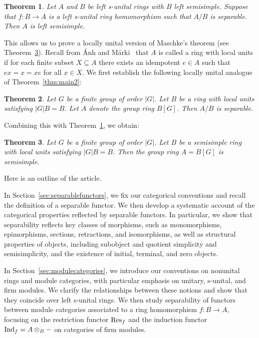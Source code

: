 \documentclass[12pt]{amsart}
\newtheorem{thm}{Theorem}
\theoremstyle{definition}
\newcommand{\Res}{{\rm Res}}
\newcommand{\Ind}{{\rm Ind}}
\begin{document}
\begin{thm}\label{thm:main4}
Let $A$ and $B$ be left s-unital rings
with $B$ left semisimple.
Suppose that $f : B \to A$ is a left s-unital 
ring homomorphism such that $A/B$ 
is separable.
Then $A$ is left semisimple.
\end{thm}

This allows us to prove a locally unital version of Maschke's
theorem (see Theorem~\ref{thm:main6}). 
Recall from \'{A}nh and 
M\'{a}rki~\cite{anh1987} that $A$
is called a ring with local units if for each
finite subset $X \subseteq A$ there exists
an idempotent $e \in A$ such that 
$ex = x = xe$ for all $x \in X$.
We first establish the following locally unital
analogue of Theorem~\ref{thm:main2}:

\begin{thm}\label{thm:main5}
Let $G$ be a finite group 
of order $|G|$.
Let $B$ be a ring with local units
satisfying $|G|B = B$. 
Let $A$ denote the group ring $B[G]$. 
Then $A/B$ is separable.
\end{thm}

Combining this with Theorem~\ref{thm:main4}, 
we obtain:

\begin{thm}\label{thm:main6}
Let $G$ be a finite group 
of order $|G|$.
Let $B$ be a semisimple ring with local units 
satisfying $|G|B = B$. 
Then the group ring $A = B[G]$ is semisimple.
\end{thm}

Here is an outline of the article.

In Section~\ref{sec:separablefunctors}, 
we fix our categorical conventions and 
recall the definition of a separable 
functor. We then develop a systematic account of the categorical properties reflected by separable functors. In particular, we show that separability reflects key classes of morphisms, such as monomorphisms, epimorphisms, sections, retractions, and isomorphisms, as well as structural properties of objects, including subobject and quotient simplicity and semisimplicity, and the existence of initial, terminal, and zero objects. 

In Section~\ref{sec:modulecategories}, we introduce our conventions on nonunital rings and module categories, with particular emphasis on unitary, s-unital, and firm modules. We clarify the relationships between these notions and show that they coincide over left s-unital rings. We then study separability of functors between module categories associated to a ring homomorphism $f : B \to A$, focusing on the restriction functor $\Res_f$ and the induction functor $\Ind_f = A \otimes_B -$ on categories of firm modules. 
\end{document}
